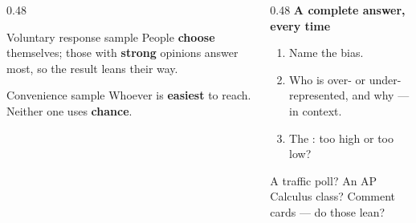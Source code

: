 \documentclass[aspectratio=169, 11pt]{beamer}
\begin{document}
\begin{frame}[t, plain]
  \vspace{2pt}
  \begin{columns}[t]
    \begin{column}{0.48\textwidth}
      \begin{block}{Voluntary response sample}
        People \textbf{choose} themselves; those with \textbf{strong} opinions answer most, so
        the result leans their way.
      \end{block}
      \vspace{3pt}
      \begin{block}{Convenience sample}
        Whoever is \textbf{easiest} to reach. Neither one uses \textbf{chance}.
      \end{block}
    \end{column}
    \begin{column}{0.48\textwidth}
      {\small\textbf{A complete answer, every time}}
      \begin{enumerate}\setlength{\itemsep}{3pt}\small
        \item Name the bias.
        \item Who is over- or under-represented, and why --- in context.
        \item The : too high or too low?
      \end{enumerate}
      \vspace{6pt}
      {\small A traffic poll? An AP Calculus class? Comment cards ---  do
      those lean?}
    \end{column}
  \end{columns}
\end{frame}
\end{document}
